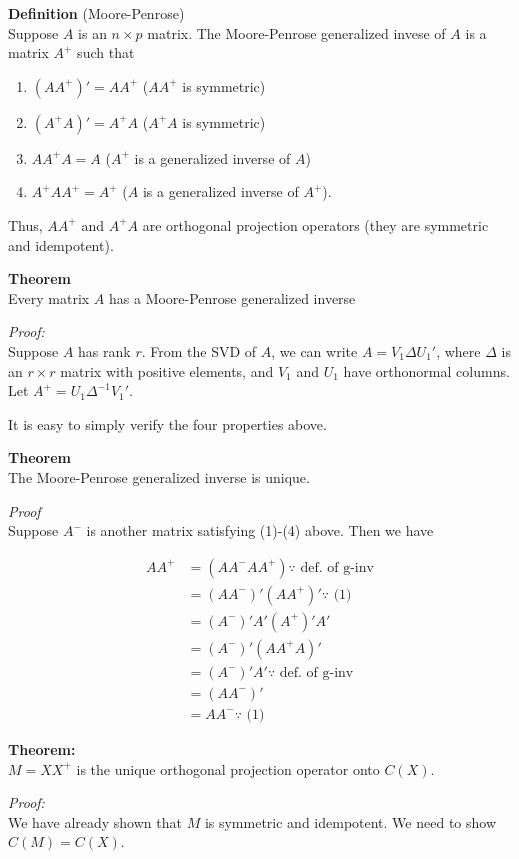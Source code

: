 \documentclass[12pt]{article}
\numberwithin{equation}{section}
\begin{document}
\textbf{Definition} (Moore-Penrose) \\
Suppose $A$ is an $n \times p$ matrix. The Moore-Penrose generalized invese of $A$ is a matrix $A^+$ such that 
\begin{enumerate}
  \item $(AA^+)' = AA^+$ ($AA^+$ is symmetric)
  \item $(A^+ A)' = A^+ A$ ($A^+ A$ is symmetric)
  \item $A A^+ A = A$ ($A^+$ is a generalized inverse of $A$)
  \item $A^+ A A^+ = A^+$ ($A$ is a generalized inverse of $A^+$).
\end{enumerate}
Thus, $AA^+$ and $A^+ A$ are orthogonal projection operators (they are symmetric and idempotent).

\textbf{Theorem} \\
Every matrix $A$ has a Moore-Penrose generalized inverse

\textit{Proof:}\\
Suppose $A$ has rank $r$. From the SVD of $A$, we can write $A = V_1 \Delta U_1'$, where $\Delta$ is an $r \times r$ matrix with positive elements, and $V_1$ and $U_1$ have orthonormal columns. Let $A^+ = U_1 \Delta^{-1} V_1'$. 

It is easy to simply verify the four properties above.

\textbf{Theorem} \\
The Moore-Penrose generalized inverse is unique.

\textit{Proof} \\
Suppose $A^{-}$ is another matrix satisfying (1)-(4) above. Then we have

\begin{align*}
  A A^+ &= (A A^- A A^+) \because \text{ def. of g-inv} \\
    &= (A A^-)' (A A^+)' \because \text{ (1)} \\
    &= (A^-)' A' (A^+)' A' \\
    &= (A^-)' (A A^+ A)' \\
    &= (A^-)' A' \because \text{ def. of g-inv} \\
    &= (A A^-)' \\
    &= A A^- \because \text{ (1)}
\end{align*}

\textbf{Theorem:} \\
$M = X X^+$ is the unique orthogonal projection operator onto $C(X)$.

\textit{Proof:} \\
We have already shown that $M$ is symmetric and idempotent. We need to show $C(M) = C(X)$.
\end{document}
